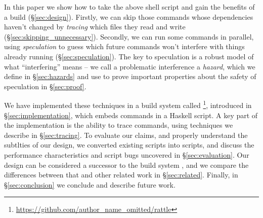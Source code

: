 In this paper we show how to take the above shell script and gain the benefits of a \Make build (\S\ref{sec:design}). Firstly, we can skip those commands whose dependencies haven't changed by \emph{tracing} which files they read and write (\S\ref{sec:skipping_unnecessary}). Secondly, we can run some commands in parallel, using \emph{speculation} to guess which future commands won't interfere with things already running (\S\ref{sec:speculation}). The key to speculation is a robust model of what ``interfering'' means -- we call a problematic interference a \emph{hazard}, which we define in \S\ref{sec:hazards} and use to prove important properties about the safety of speculation in \S\ref{sec:proof}.

We have implemented these techniques in a build system called \Rattle\footnote{\url{https://github.com/author_name_omitted/rattle}}, introduced in \S\ref{sec:implementation}, which embeds commands in a Haskell script. A key part of the implementation is the ability to trace commands, using techniques we describe in \S\ref{sec:tracing}. To evaluate our claims, and properly understand the subtlties of our design, we converted existing \Make scripts into \Rattle scripts, and discuss the performance characteristics and \Make script bugs uncovered in \S\ref{sec:evaluation}. Our design can be considered a successor to the \Memoize build system \cite{memoize}, and we compare the differences between that and other related work in \S\ref{sec:related}. Finally, in \S\ref{sec:conclusion} we conclude and describe future work.

